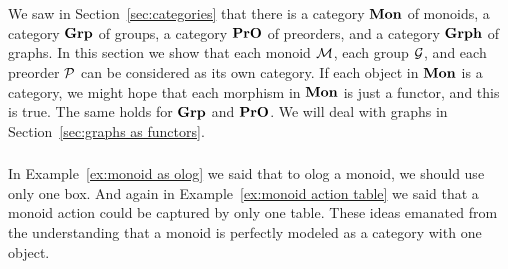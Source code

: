 \documentclass[CT4S-EN-RU]{subfiles}
\begin{document}
\section{}


\subsection{}\label{sec:mon grp pro as cat}

\begin{blockENG}
We saw in Section~\ref{sec:categories} that there is a category ${\mathbf{Mon}}$ of monoids, a category ${\mathbf{Grp}}$ of groups, a category ${\mathbf{PrO}}$ of preorders, and a category ${\mathbf{Grph}}$ of graphs. In this section we show that each monoid $\mathcal{M}$, each group $\mathcal{G}$, and each preorder $\mathcal{P}$ can be considered as its own category. If each object in ${\mathbf{Mon}}$ is a category, we might hope that each morphism in ${\mathbf{Mon}}$ is just a functor, and this is true. The same holds for ${\mathbf{Grp}}$ and ${\mathbf{PrO}}$. We will deal with graphs in Section~\ref{sec:graphs as functors}.
\end{blockENG}

\begin{blockRUS}
\end{blockRUS}


\subsubsection{}\label{sec:monoids as cats}

\begin{blockENG}
In Example~\ref{ex:monoid as olog} we said that to olog a monoid, we should use only one box. And again in Example~\ref{ex:monoid action table} we said that a monoid action could be captured by only one table. These ideas emanated from the understanding that a monoid is perfectly modeled as a category with one object. 
\end{blockENG}

\begin{blockRUS}
\end{blockRUS}

\paragraph{} ~\\
\end{document}
